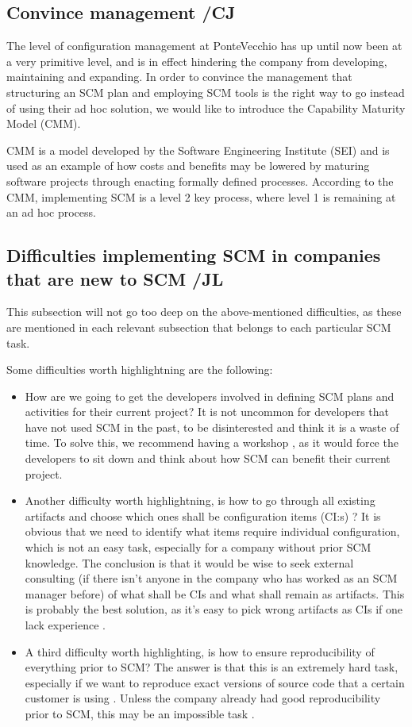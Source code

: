 \documentclass[10pt]{article}
\begin{document}
\subsection{Convince management /CJ}
The level of configuration management at PonteVecchio has up until now been at a very primitive level, and is in effect hindering the company from developing, maintaining and expanding. In order to convince the management that structuring an SCM plan and employing SCM tools is the right way to go instead of using their ad hoc solution, we would like to introduce the Capability Maturity Model (CMM). 

\noindent CMM is a model developed by the Software Engineering Institute (SEI) and is used as an example of how costs and benefits may be lowered by maturing software projects through enacting formally defined processes. According to the CMM, implementing SCM is a level 2 key process, where level 1 is remaining at an ad hoc process.

\subsection{Difficulties implementing SCM in companies that are new to SCM /JL}
This subsection will not go too deep on the above-mentioned difficulties, as these are mentioned in each relevant subsection that belongs to each particular SCM task.

Some difficulties worth highlightning are the following:
\begin{itemize}
\item How are we going to get the developers involved in defining SCM plans and activities for their current project? It is not uncommon for developers that have not used SCM in the past, to be disinterested and think it is a waste of time. To solve this, we recommend having a workshop \cite{Vinter}, as it would force the developers to sit down and think about how SCM can benefit their current project.

\item Another difficulty worth highlightning, is how to go through all existing artifacts and choose which ones shall be configuration items (CI:s) \cite{Kelly2}? It is obvious that we need to identify what items require individual configuration, which is not an easy task, especially for a company without prior SCM knowledge. The conclusion is that it would be wise to seek external consulting (if there isn't anyone in the company who has worked as an SCM manager before) of what shall be CIs and what shall remain as artifacts. This is probably the best solution, as it's easy to pick wrong artifacts as CIs if one lack experience \cite{Daniels3}\cite{Kelly2}.

\item A third difficulty worth highlighting, is how to ensure reproducibility of everything prior to SCM? The answer is that this is an extremely hard task, especially if we want to reproduce exact versions of source code that a certain customer is using \cite{Appleton2}. Unless the company already had good reproducibility prior to SCM, this may be an impossible task \cite{Bays}. 

\end{itemize}
\end{document}
